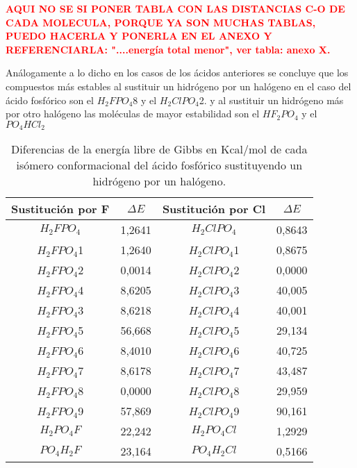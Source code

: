 {\bfseries\textcolor{red} {AQUI NO SE SI PONER TABLA CON LAS DISTANCIAS C-O DE CADA MOLECULA, PORQUE YA SON MUCHAS TABLAS, PUEDO HACERLA Y PONERLA EN EL ANEXO Y REFERENCIARLA: "....energía total menor", ver tabla: anexo X.}}

Análogamente a lo dicho en los casos de los ácidos anteriores se concluye que los compuestos más estables al sustituir un hidrógeno por un halógeno en el caso del ácido fosfórico son el $H_2FPO_4$8 y el $H_2ClPO_4$2. y al sustituir un hidrógeno más por otro halógeno las moléculas de mayor estabilidad son el $HF_2PO_4$ y el $PO_4HCl_2$ 

\begin{table}[H]
\begin{center}
\begin{tabular}{|c|c|c|c|}
\hline
Sustitución por F & $\Delta E$ & Sustitución por Cl & $\Delta E$ \\ \hline
$H_2FPO_4$& 1,2641 & $H_2ClPO_4$ & 0,8643 \\ \hline
$H_2FPO_4$1 & 1,2640 & $H_2ClPO_4$1 & 0,8675 \\ \hline
$H_2FPO_4$2 & 0,0014 & $H_2ClPO_4$2 & 0,0000 \\ \hline
$H_2FPO_4$4	& 8,6205 & $H_2ClPO_4$3 & 40,005 \\ \hline
$H_2FPO_4$3	& 8,6218 & $H_2ClPO_4$4 & 40,001 \\ \hline
$H_2FPO_4$5	& 56,668 & $H_2ClPO_4$5 & 29,134 \\ \hline
$H_2FPO_4$6	& 8,4010 & $H_2ClPO_4$6 & 40,725 \\ \hline
$H_2FPO_4$7	& 8,6178 & $H_2ClPO_4$7 & 43,487 \\ \hline
$H_2FPO_4$8	& 0,0000 & $H_2ClPO_4$8 & 29,959 \\ \hline
$H_2FPO_4$9	& 57,869 & $H_2ClPO_4$9 & 90,161 \\ \hline
$H_2PO_4F$ & 22,242 & $H_2PO_4Cl$ & 1,2929 \\ \hline
$PO_4H_2F$ & 23,164 & $PO_4H_2Cl$ & 0,5166 \\ \hline
\end{tabular}
\caption{Diferencias de la energía libre de Gibbs en Kcal/mol de cada isómero conformacional del ácido fosfórico sustituyendo un hidrógeno por un halógeno.}
\end{center}
\end{table}

